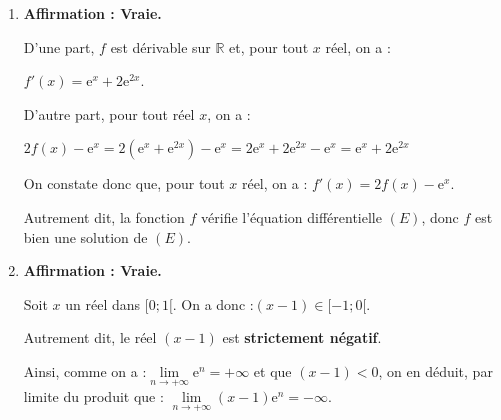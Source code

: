 \documentclass[10pt]{article}
\providecommand{\R}{\mathbb{R}}
\providecommand{\e}{{\mathrm{e}}}
\providecommand{\np}[2][]{{#2~#1}}
\begin{document}
\begin{enumerate}
	On a alors : \quad
	$\begin{aligned}[t] \displaystyle
		J &= \int_{1}^{2} x\ln(x) ~\mathrm{dt} \\
		&= \int_{1}^{2} u'(x)\times v(x) ~\mathrm{dt} \quad \text{donc, par intégration par parties :}\\
		&= \Big[u(x) \times v(x)\Big]_1^2 - \int_{1}^{2} u(x)\times v'(x) ~\mathrm{dt} \\
		&= \left[\dfrac{1}{2}x^2 \times \ln(x) \right]_1^2 - \int_{1}^{2} \dfrac{1}{2}x^2\times \dfrac{1}{x} ~\mathrm{dt} \\
		&= \left(\dfrac{1}{2}\times 2^2 \times \ln(2)\right) - \left(\dfrac{1}{2}\times 1^2 \times \ln(1)\right) -\dfrac{1}{2} \int_{1}^{2} x~\mathrm{d}x\\
		&= 2 \ln(2) - 0 -\dfrac{1}{2} \left[\dfrac{1}{2}x^2\right]_{1}^{2}\\
		&= 2\ln(2) -\dfrac{1}{2}\left[\left(\dfrac{1}{2}\times 2^2\right) - \left(\dfrac{1}{2}\times 1^2\right)\right]\\
		&=2\ln(2) - \dfrac{3}{4} \approx \np{0,63629}
	\end{aligned}$

	Or $\dfrac{7}{11} \approx \np{0,63636}$, donc $J \neq \dfrac{7}{11}$.

	\item \textbf{Affirmation \theenumi : Vraie.}

D'une part, $f$ est dérivable sur $\R$ et, pour tout $x$ réel, on a :

$f'(x) = \e^{x} + 2\e^{2x}$.

D'autre part, pour tout réel $x$, on a :

$2f(x) - \e^{x} = 2\left(\e^{x} + \e^{2x}\right) - \e^{x} = 2\e^{x} + 2\e^{2x} - \e^{x} = \e^{x} + 2\e^{2x}$

On constate donc que, pour tout $x$ réel, on a : \quad $f'(x) = 2f(x) - \e^{x}$.

Autrement dit, la fonction $f$ vérifie l'équation différentielle $(E)$, donc $f$ est bien une solution de $(E)$.

	\item \textbf{Affirmation \theenumi : Vraie.}

Soit $x$ un réel dans $[0 ; 1[$. On a donc :\quad $(x - 1)\in [-1 ; 0[$.

Autrement dit, le réel $(x - 1)$ est \textbf{strictement négatif}.

Ainsi, comme on a :\quad $\lim\limits_{n \to +\infty} \e^{n} = +\infty$ \quad et que $(x-1)< 0$, on en déduit, par limite du produit que : \quad $\lim\limits_{n \to +\infty} (x-1) \e^{n} = -\infty$.


\end{enumerate}
\end{document}
